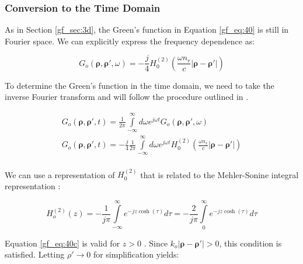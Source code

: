 \subsubsection {Conversion to the Time Domain}
As in Section \ref{gf_sec:3d}, the Green's function in Equation \ref{gf_eq:40} is still in Fourier space. We can explicitly express the frequency dependence as:

\begin{equation}
G_o\left(\boldsymbol{\rho},\boldsymbol{\rho}',\omega\right) = -\frac{j}{4}H_0^{(2)}\left(\frac{\omega n_r}{c}|\boldsymbol{\rho} - \boldsymbol{\rho}' | \right)
\label{gf_eq:40a}
\end{equation}
\renewcommand{\baselinestretch}{2} \small\normalsize

To determine the Green's function in the time domain, we need to take the inverse Fourier transform and will follow the procedure outlined in \cite{gbur_math}.

\begin{equation}
\begin{gathered}
G_o\left(\boldsymbol{\rho},\boldsymbol{\rho}',t\right) = \frac{1}{2\pi}\int\limits_{-\infty}^{\infty}d\omega e^{j\omega t}G_o\left(\boldsymbol{\rho},\boldsymbol{\rho}',\omega\right) \\
G_o\left(\boldsymbol{\rho},\boldsymbol{\rho}',t\right) = -\frac{j}{4}\frac{1}{2\pi}\int\limits_{-\infty}^{\infty}d\omega e^{j\omega t} H_0^{(2)}\left(\frac{\omega n_r}{c}|\boldsymbol{\rho} - \boldsymbol{\rho}' | \right)\\
\end{gathered}
\label{gf_eq:40b}
\end{equation}
\renewcommand{\baselinestretch}{2} \small\normalsize

We can use a representation of $H_0^{(2)}$ that is related to the Mehler-Sonine integral representation \cite{nist_handbook}:

\begin{equation}
H_o^{(2)}\left(z\right) = -\frac{1}{j\pi}\int\limits_{-\infty}^{\infty}e^{-jz\cosh(\tau)}d\tau = -\frac{2}{j\pi}\int\limits_{0}^{\infty}e^{-jz\cosh(\tau)}d\tau
\label{gf_eq:40c}
\end{equation}
\renewcommand{\baselinestretch}{2} \small\normalsize

\noindent Equation \ref{gf_eq:40c} is valid for $z>0$ . Since $k_o| \boldsymbol{\rho} - \boldsymbol{\rho}'| > 0$, this condition is satisfied. Letting $\rho' \rightarrow 0$ for simplification yields:

